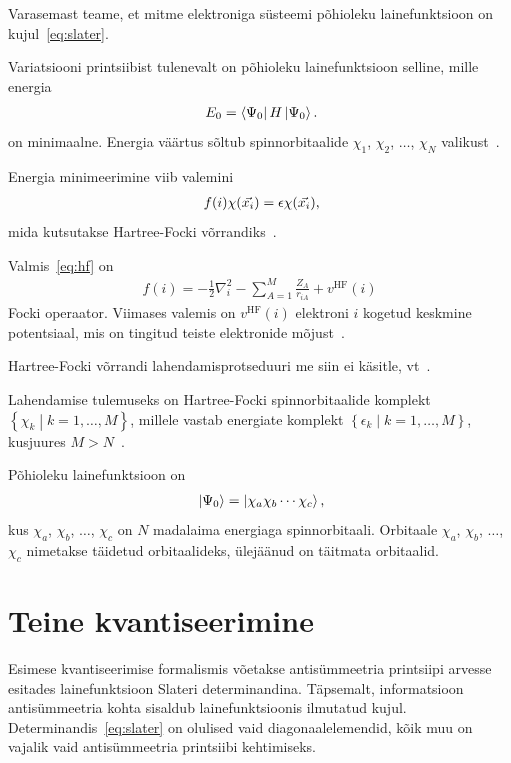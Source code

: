 \documentclass[12pt]{report}
\def\cparen#1{\left\{#1\right\}}
\def\bra#1{\mathinner{\langle#1|}}
\def\ket#1{\mathinner{|#1\rangle}}
\begin{document}
Varasemast teame, et mitme elektroniga süsteemi põhioleku lainefunktsioon on kujul~\eqref{eq:slater}.

Variatsiooni printsiibist tulenevalt on põhioleku lainefunktsioon selline, mille energia
\begin{align}
    E_0 = \bra{\Psi_0} H \ket{\Psi_0} \rlap{.}
\end{align}
on minimaalne.
Energia väärtus sõltub spinnorbitaalide \(\chi_1\), \(\chi_2\), \(\ldots\), \(\chi_N\) valikust~\cite{szabo+ostlund}.

Energia minimeerimine viib valemini
\begin{align}\label{eq:hf}
    f(i) \chi(\vec{x_i}) = \epsilon \chi(\vec{x_i}) \rlap{,}
\end{align}
mida kutsutakse Hartree-Focki võrrandiks~\cite{szabo+ostlund}.

Valmis~\eqref{eq:hf} on
\begin{align}
    f(i) = -\frac{1}{2} \nabla_i^2 - \sum_{A = 1}^M \frac{Z_A}{r_{iA}} + v^\text{HF}(i)
\end{align}
Focki operaator.
Viimases valemis on \(v^\text{HF}(i)\) elektroni \(i\) kogetud keskmine potentsiaal, mis on tingitud teiste elektronide mõjust~\cite{szabo+ostlund}.

Hartree-Focki võrrandi lahendamisprotseduuri me siin ei käsitle, vt~\cite{szabo+ostlund}.

Lahendamise tulemuseks on Hartree-Focki spinnorbitaalide komplekt \(\cparen{\chi_k \middle| k = 1, \ldots, M}\), millele vastab energiate komplekt \(\cparen{\epsilon_k \middle| k = 1, \ldots, M}\), kusjuures \(M > N\)~\cite{szabo+ostlund}.

Põhioleku lainefunktsioon on
\begin{align}
    \ket{\Psi_0} = \ket{\chi_a \chi_b \cdots \chi_c} \rlap{,}
\end{align}
kus \(\chi_a\), \(\chi_b\), \(\ldots\), \(\chi_c\) on \(N\) madalaima energiaga spinnorbitaali.
Orbitaale \(\chi_a\), \(\chi_b\), \(\ldots\), \(\chi_c\) nimetakse täidetud orbitaalideks, ülejäänud on täitmata orbitaalid.

\section{Teine kvantiseerimine}\label{sec:secquant}

Esimese kvantiseerimise formalismis võetakse antisümmeetria printsiipi arvesse esitades lainefunktsioon Slateri determinandina.
Täpsemalt, informatsioon antisümmeetria kohta sisaldub lainefunktsioonis ilmutatud kujul.
Determinandis~\eqref{eq:slater} on olulised vaid diagonaalelemendid, kõik muu on vajalik vaid antisümmeetria printsiibi kehtimiseks.
\end{document}
